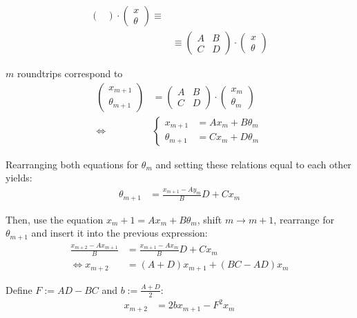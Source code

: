 \documentclass{article}
\begin{document}
{\begin{align*}
\begin{pmatrix}
			\end{pmatrix}
			\cdot
			\begin{pmatrix}
				x \\ \theta
			\end{pmatrix}
			\equiv \\
			&\equiv
			\begin{pmatrix}
				A & B \\
				C & D
			\end{pmatrix}
			\cdot
			\begin{pmatrix}
				x \\ \theta
			\end{pmatrix}
		\end{align*}
	
	$m$ roundtrips correspond to
		\begin{align*}
			\begin{pmatrix}
				x_{m+1} \\ \theta_{m+1}
			\end{pmatrix}
			&=
			\begin{pmatrix}
				A & B \\
				C & D
			\end{pmatrix}
			\cdot
			\begin{pmatrix}
				x_m \\ \theta_m
			\end{pmatrix} \\
			\Leftrightarrow
			&
			\begin{cases}
				x_{m+1} &= A x_m + B \theta_m \\
				\theta_{m+1} &= C x_m + D \theta_m
			\end{cases}
		\end{align*}
	
	Rearranging both equations for $\theta_m$ and setting these relations equal to each other yields:
		\begin{align*}
			\theta_{m+1} &= \frac{x_{m+1} - A y_m}{B} D + C x_m
		\end{align*}
	
	Then, use the equation $x_m+1 = A x_m + B \theta_m$, shift $m\to m+1$, rearrange for $\theta_{m+1}$ and insert it into the previous expression:
		\begin{align*}
			\frac{x_{m+2} - A x_{m+1}}{B} &= \frac{x_{m+1} - A x_m}{B}D + C x_m \\
			\Leftrightarrow x_{m+2} &= (A+D) x_{m+1} + (BC - AD) x_m
		\end{align*}
	
	Define $F := AD-BC$ and $b := \frac{A+D}{2}$:
		\begin{align*}
			x_{m+2} &= 2b x_{m+1} - F^2 x_m
		\end{align*}
	
}
\end{document}
